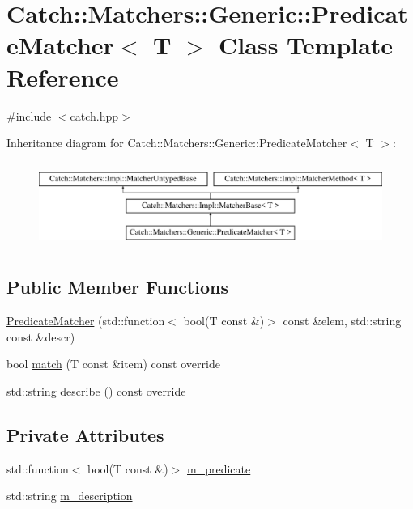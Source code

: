 \hypertarget{class_catch_1_1_matchers_1_1_generic_1_1_predicate_matcher}{}\section{Catch\+::Matchers\+::Generic\+::Predicate\+Matcher$<$ T $>$ Class Template Reference}
\label{class_catch_1_1_matchers_1_1_generic_1_1_predicate_matcher}


{\ttfamily \#include $<$catch.\+hpp$>$}

Inheritance diagram for Catch\+::Matchers\+::Generic\+::Predicate\+Matcher$<$ T $>$\+:\begin{figure}[H]
\begin{center}
\leavevmode
\includegraphics[height=2.790698cm]{class_catch_1_1_matchers_1_1_generic_1_1_predicate_matcher}
\end{center}
\end{figure}
\subsection*{Public Member Functions}
\begin{DoxyCompactItemize}
\item 
\mbox{\hyperlink{class_catch_1_1_matchers_1_1_generic_1_1_predicate_matcher_a57d53ef028c2f7b92b016f627f91aa76}{Predicate\+Matcher}} (std\+::function$<$ bool(T const \&)$>$ const \&elem, std\+::string const \&descr)
\item 
bool \mbox{\hyperlink{class_catch_1_1_matchers_1_1_generic_1_1_predicate_matcher_a2ec0e8ec19c4c5e26271d59a06a62b52}{match}} (T const \&item) const override
\item 
std\+::string \mbox{\hyperlink{class_catch_1_1_matchers_1_1_generic_1_1_predicate_matcher_af7d59e94892cc09471bbaefac4c889fd}{describe}} () const override
\end{DoxyCompactItemize}
\subsection*{Private Attributes}
\begin{DoxyCompactItemize}
\item 
std\+::function$<$ bool(T const  \&)$>$ \mbox{\hyperlink{class_catch_1_1_matchers_1_1_generic_1_1_predicate_matcher_ab7f09e9f96fb9d794e1fc699497ec3e0}{m\+\_\+predicate}}
\item 
std\+::string \mbox{\hyperlink{class_catch_1_1_matchers_1_1_generic_1_1_predicate_matcher_a7736732e65a93e4e1f889804d043407e}{m\+\_\+description}}
\end{DoxyCompactItemize}
